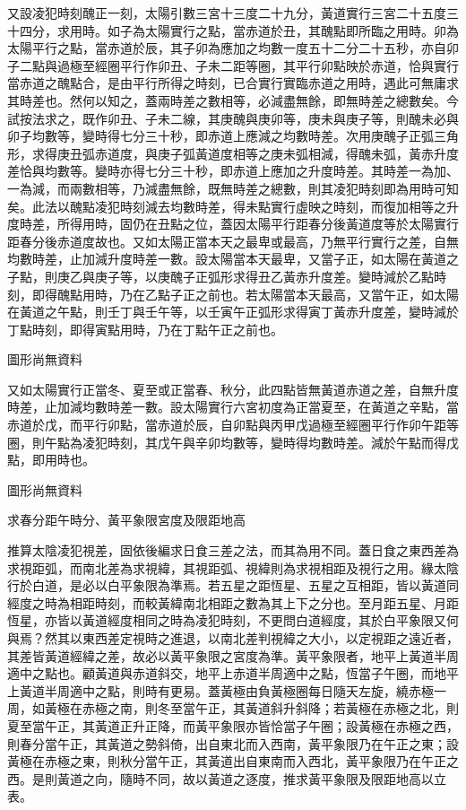 \begin{pinyinscope}
又設凌犯時刻醜正一刻，太陽引數三宮十三度二十九分，黃道實行三宮二十五度三十四分，求用時。如子為太陽實行之點，當赤道於丑，其醜點即所臨之用時。卯為太陽平行之點，當赤道於辰，其子卯為應加之均數一度五十二分二十五秒，亦自卯子二點與過極至經圈平行作卯丑、子未二距等圈，其平行卯點映於赤道，恰與實行當赤道之醜點合，是由平行所得之時刻，已合實行實臨赤道之用時，遇此可無庸求其時差也。然何以知之，蓋兩時差之數相等，必減盡無餘，即無時差之總數矣。今試按法求之，既作卯丑、子未二線，其庚醜與庚卯等，庚未與庚子等，則醜未必與卯子均數等，變時得七分三十秒，即赤道上應減之均數時差。次用庚醜子正弧三角形，求得庚丑弧赤道度，與庚子弧黃道度相等之庚未弧相減，得醜未弧，黃赤升度差恰與均數等。變時亦得七分三十秒，即赤道上應加之升度時差。其時差一為加、一為減，而兩數相等，乃減盡無餘，既無時差之總數，則其凌犯時刻即為用時可知矣。此法以醜點凌犯時刻減去均數時差，得未點實行虛映之時刻，而復加相等之升度時差，所得用時，固仍在丑點之位，蓋因太陽平行距春分後黃道度等於太陽實行距春分後赤道度故也。又如太陽正當本天之最卑或最高，乃無平行實行之差，自無均數時差，止加減升度時差一數。設太陽當本天最卑，又當子正，如太陽在黃道之子點，則庚乙與庚子等，以庚醜子正弧形求得丑乙黃赤升度差。變時減於乙點時刻，即得醜點用時，乃在乙點子正之前也。若太陽當本天最高，又當午正，如太陽在黃道之午點，則壬丁與壬午等，以壬寅午正弧形求得寅丁黃赤升度差，變時減於丁點時刻，即得寅點用時，乃在丁點午正之前也。

圖形尚無資料

又如太陽實行正當冬、夏至或正當春、秋分，此四點皆無黃道赤道之差，自無升度時差，止加減均數時差一數。設太陽實行六宮初度為正當夏至，在黃道之辛點，當赤道於戊，而平行卯點，當赤道於辰，自卯點與丙甲戊過極至經圈平行作卯午距等圈，則午點為凌犯時刻，其戊午與辛卯均數等，變時得均數時差。減於午點而得戊點，即用時也。

圖形尚無資料

求春分距午時分、黃平象限宮度及限距地高

推算太陰凌犯視差，固依後編求日食三差之法，而其為用不同。蓋日食之東西差為求視距弧，而南北差為求視緯，其視距弧、視緯則為求視相距及視行之用。緣太陰行於白道，是必以白平象限為準焉。若五星之距恆星、五星之互相距，皆以黃道同經度之時為相距時刻，而較黃緯南北相距之數為其上下之分也。至月距五星、月距恆星，亦皆以黃道經度相同之時為凌犯時刻，不更問白道經度，其於白平象限又何與焉？然其以東西差定視時之進退，以南北差判視緯之大小，以定視距之遠近者，其差皆黃道經緯之差，故必以黃平象限之宮度為準。黃平象限者，地平上黃道半周適中之點也。顧黃道與赤道斜交，地平上赤道半周適中之點，恆當子午圈，而地平上黃道半周適中之點，則時有更易。蓋黃極由負黃極圈每日隨天左旋，繞赤極一周，如黃極在赤極之南，則冬至當午正，其黃道斜升斜降；若黃極在赤極之北，則夏至當午正，其黃道正升正降，而黃平象限亦皆恰當子午圈；設黃極在赤極之西，則春分當午正，其黃道之勢斜倚，出自東北而入西南，黃平象限乃在午正之東；設黃極在赤極之東，則秋分當午正，其黃道出自東南而入西北，黃平象限乃在午正之西。是則黃道之向，隨時不同，故以黃道之逐度，推求黃平象限及限距地高以立表。


\end{pinyinscope}
